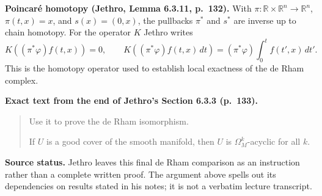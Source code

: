 \medskip\noindent
{\bf Poincar\'e homotopy (Jethro, Lemma 6.3.11, p.~132).}
With $\pi:\mathbb R\times\mathbb R^n\to\mathbb R^n$,
$\pi(t,x)=x$, and $s(x)=(0,x)$, the pullbacks
$\pi^*$ and $s^*$ are inverse up to chain homotopy.
For the operator $K$ Jethro writes
\[K((\pi^*\varphi)f(t,x))=0,\qquad
K((\pi^*\varphi)f(t,x)\,dt)
=(\pi^*\varphi)\int_0^t f(t',x)\,dt'.\]
This is the homotopy operator used to establish
local exactness of the de Rham complex.

\medskip\noindent
{\bf Exact text from the end of Jethro's Section 6.3.3
(p.~133).}
\begin{quote}
Use it to prove the de Rham isomorphism.

If $U$ is a good cover of the smooth manifold, then
$U$ is $\Omega_M^k$-acyclic for all $k$.
\end{quote}

\noindent
{\bf Source status.} Jethro leaves this final de Rham
comparison as an instruction rather than a complete
written proof. The argument above spells out its
dependencies on results stated in his notes; it is
not a verbatim lecture transcript.

